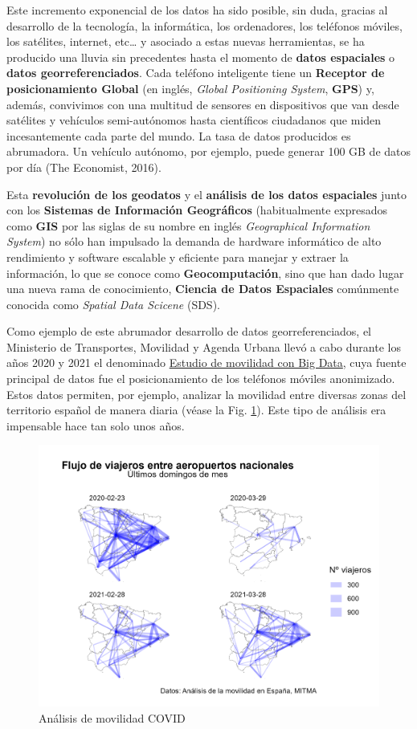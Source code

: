 \documentclass[
]{report}
\begin{document}
Este incremento exponencial de los datos ha sido posible, sin duda, gracias al
desarrollo de la tecnología, la informática, los ordenadores, los teléfonos
móviles, los satélites, internet, etc\ldots{} y asociado a estas nuevas herramientas,
se ha producido una lluvia sin precedentes hasta el momento de \textbf{datos
espaciales} o \textbf{datos georreferenciados}. Cada teléfono inteligente tiene un
\textbf{Receptor de posicionamiento Global} (en inglés, \emph{Global Positioning System},
\textbf{GPS}) y, además, convivimos con una multitud de sensores en dispositivos que
van desde satélites y vehículos semi-autónomos hasta científicos ciudadanos que
miden incesantemente cada parte del mundo. La tasa de datos producidos es
abrumadora. Un vehículo autónomo, por ejemplo, puede generar 100 GB de datos por
día (The Economist, 2016).

Esta \textbf{revolución de los geodatos} y el \textbf{análisis de los datos espaciales}
junto con los \textbf{Sistemas de Información Geográficos} (habitualmente expresados
como \textbf{GIS} por las siglas de su nombre en inglés \emph{Geographical Information
System}) no sólo han impulsado la demanda de hardware informático de alto
rendimiento y software escalable y eficiente para manejar y extraer la
información, lo que se conoce como \textbf{Geocomputación}, sino que han dado lugar
una nueva rama de conocimiento, \textbf{Ciencia de Datos Espaciales} comúnmente
conocida como \emph{Spatial Data Scicene} (SDS).

Como ejemplo de este abrumador desarrollo de datos georreferenciados, el
Ministerio de Transportes, Movilidad y Agenda Urbana llevó a cabo durante los
años 2020 y 2021 el denominado \href{https://www.mitma.gob.es/ministerio/covid-19/evolucion-movilidad-big-data}{Estudio de movilidad con Big
Data},
cuya fuente principal de datos fue el posicionamiento de los teléfonos móviles
anonimizado. Estos datos permiten, por ejemplo, analizar la movilidad entre
diversas zonas del territorio español de manera diaria (véase la Fig.
\ref{fig:mov}). Este tipo de análisis era impensable hace tan solo unos años.

\begin{figure}

{\centering \includegraphics[width=0.6\linewidth]{img/movilidad_covid} 

}

\caption{Análisis de movilidad COVID}\label{fig:mov}
\end{figure}
\end{document}
